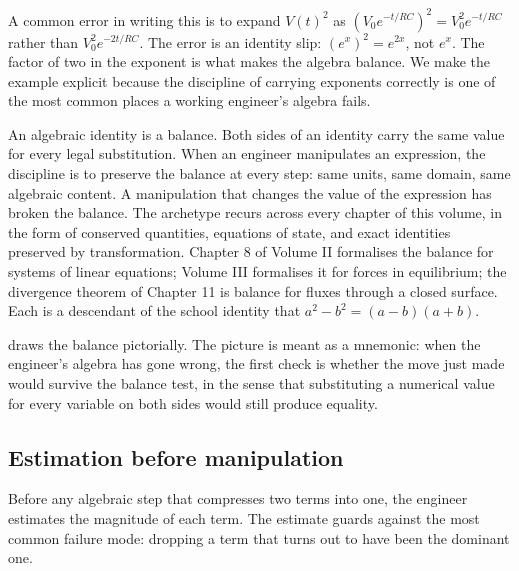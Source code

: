 A common error in writing this is to expand $V(t)^{2}$ as $(V_{0}
e^{-t/RC})^{2} = V_{0}^{2} e^{-t/RC}$ rather than $V_{0}^{2}
e^{-2t/RC}$. The error is an identity slip: $(e^{x})^{2} = e^{2x}$,
not $e^{x}$. The factor of two in the exponent is what makes the
algebra balance. We make the example explicit because the discipline
of carrying exponents correctly is one of the most common places a
working engineer's algebra fails.

\begin{archetype}[Balance]
An algebraic identity is a balance. Both sides of an identity carry
the same value for every legal substitution. When an engineer
manipulates an expression, the discipline is to preserve the balance
at every step: same units, same domain, same algebraic content. A
manipulation that changes the value of the expression has broken the
balance. The archetype recurs across every chapter of this volume,
in the form of conserved quantities, equations of state, and exact
identities preserved by transformation. Chapter 8 of Volume II
formalises the balance for systems of linear equations; Volume III
formalises it for forces in equilibrium; the divergence theorem of
Chapter 11 is balance for fluxes through a closed surface. Each is a
descendant of the school identity that $a^{2} - b^{2} = (a-b)(a+b)$.
\end{archetype}



 draws the balance pictorially.
The picture is meant as a mnemonic: when the engineer's algebra has
gone wrong, the first check is whether the move just made would
survive the balance test, in the sense that substituting a numerical
value for every variable on both sides would still produce equality.

\subsection{Estimation before manipulation}

Before any algebraic step that compresses two terms into one, the
engineer estimates the magnitude of each term. The estimate guards
against the most common failure mode: dropping a term that turns out
to have been the dominant one.

